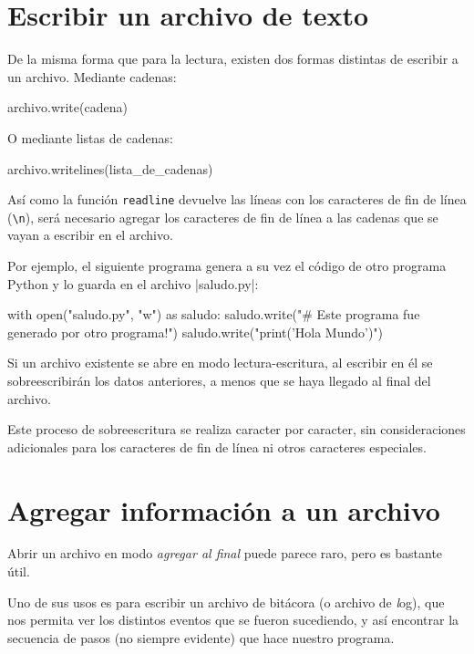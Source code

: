 \section{Escribir un archivo de texto}

De la misma forma que para la lectura, existen dos formas distintas de
escribir a un archivo.  Mediante cadenas:

\begin{codigo-python-sn}
archivo.write(cadena)
\end{codigo-python-sn}

O mediante listas de cadenas:

\begin{codigo-python-sn}
archivo.writelines(lista_de_cadenas)
\end{codigo-python-sn}

Así como la función \lstinline!readline! devuelve las líneas con los caracteres
de fin de línea (\lstinline!\n!), será necesario agregar los caracteres de
fin de línea a las cadenas que se vayan a escribir en el archivo.

Por ejemplo, el siguiente programa genera a su vez el código de otro programa
Python y lo guarda en el archivo |saludo.py|:

\begin{codigo-python-sn}
with open("saludo.py", "w") as saludo:
    saludo.write("# Este programa fue generado por otro programa!\n")
    saludo.write("print('Hola Mundo')\n")
\end{codigo-python-sn}

\begin{atencion}
Si un archivo existente se abre en modo lectura-escritura, al escribir en
él se sobreescribirán los datos anteriores, a menos que se haya llegado al
final del archivo.

Este proceso de sobreescritura se realiza caracter por caracter, sin
consideraciones adicionales para los caracteres de fin de línea ni otros
caracteres especiales.
\end{atencion}

\section{Agregar información a un archivo}

Abrir un archivo en modo \emph{agregar al final} puede parece raro,
pero es bastante útil.

Uno de sus usos es para escribir un archivo de bitácora (o archivo de
{\textit log}), que nos permita ver los distintos eventos que se fueron
sucediendo, y así encontrar la secuencia de pasos (no siempre evidente) que
hace nuestro programa.

